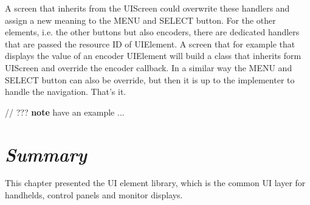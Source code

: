 A screen that inherits from the UIScreen could overwrite these handlers and assign a new meaning to the MENU and SELECT button. For the other elements, i.e. the other buttons but also encoders, there are dedicated handlers that are passed the resource ID of UIElement. A screen that for example that displays the value of an encoder UIElement will build a class that inherits form UIScreen and override the encoder callback. In a similar way the MENU and SELECT button can also be override, but then it is up to the implementer to handle the navigation. That's it.

// ??? \textbf{note} have an example ...

\section{\textit{Summary}}

This chapter presented the UI element library, which is the common UI layer for handhelds, control panels and monitor displays.
